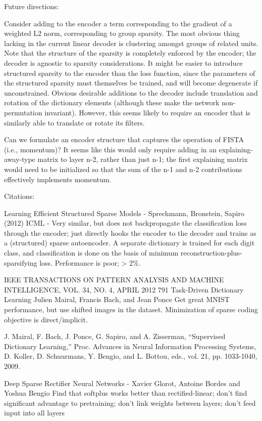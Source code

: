 Future directions:

Consider adding to the encoder a term corresponding to the gradient of a weighted L2 norm, corresponding to group sparsity.  The most obvious thing lacking in the current linear decoder is clustering amongst groups of related units.  Note that the structure of the sparsity is completely enforced by the encoder; the decoder is agnostic to sparsity considerations.  It might be easier to introduce structured sparsity to the encoder than the loss function, since the parameters of the structured sparsity must themselves be trained, and will become degenerate if unconstrained.
Obvious desirable additions to the decoder include translation and rotation of the dictionary elements (although these make the network non-permutation invariant).  However, this seems likely to require an encoder that is similarly able to translate or rotate its filters.

Can we formulate an encoder structure that captures the operation of FISTA (i.e., momentum)?  It seems like this would only require adding in an explaining-away-type matrix to layer n-2, rather than just n-1; the first explaining matrix would need to be initialized so that the sum of the n-1 and n-2 contributions effectively implements momentum. 



Citations:

Learning Efficient Structured Sparse Models - Sprechmann, Bronstein, Sapiro (2012) ICML - Very similar, but does not backpropagate the classification loss through the encoder; just directly hooks the encoder to the decoder and trains as a (structured) sparse autoencoder.  A separate dictionary is trained for each digit class, and classification is done on the basis of minimum reconstruction-plus-sparsifying loss.  Performance is poor; > 2\%.  

IEEE TRANSACTIONS ON PATTERN ANALYSIS AND MACHINE INTELLIGENCE, VOL. 34, NO. 4, APRIL 2012 791
Task-Driven Dictionary Learning Julien Mairal, Francis Bach, and Jean Ponce
Get great MNIST performance, but use shifted images in the dataset.  Minimization of sparse coding objective is direct/implicit.

J. Mairal, F. Bach, J. Ponce, G. Sapiro, and A. Zisserman, “Supervised Dictionary Learning,” Proc. Advances in Neural Information Processing Systems, D. Koller, D. Schuurmans, Y. Bengio, and L. Bottou, eds., vol. 21, pp. 1033-1040, 2009.



Deep Sparse Rectifier Neural Networks - Xavier Glorot, Antoine Bordes and Yoshua Bengio
Find that softplus works better than rectified-linear; don't find significant advantage to pretraining; don't link weights between layers; don't feed input into all layers

